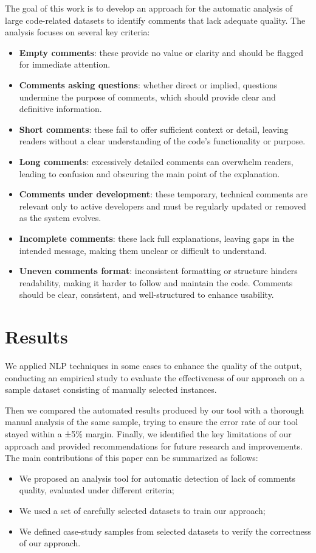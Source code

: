 \noindent The goal of this work is to develop an approach for the automatic analysis of large code-related datasets to identify comments that lack adequate quality. The analysis focuses on several key criteria:
\begin{itemize}
	\item \textbf{Empty comments}: these provide no value or clarity and should be flagged for immediate attention.
	\item \textbf{Comments asking questions}: whether direct or implied, questions undermine the purpose of comments, which should provide clear and definitive information.
	\item \textbf{Short comments}: these fail to offer sufficient context or detail, leaving readers without a clear understanding of the code’s functionality or purpose.
	\item \textbf{Long comments}: excessively detailed comments can overwhelm readers, leading to confusion and obscuring the main point of the explanation.
	\item \textbf{Comments under development}: these temporary, technical comments are relevant only to active developers and must be regularly updated or removed as the system evolves.
	\item \textbf{Incomplete comments}: these lack full explanations, leaving gaps in the intended message, making them unclear or difficult to understand.
	\item \textbf{Uneven comments format}: inconsistent formatting or structure hinders readability, making it harder to follow and maintain the code. Comments should be clear, consistent, and well-structured to enhance usability.
\end{itemize}

\section{Results}
We applied NLP techniques in some cases to enhance the quality of the output, conducting an empirical study to evaluate the effectiveness of our approach on a sample dataset consisting of manually selected instances.

\noindent Then we compared the automated results produced by our tool with a thorough manual analysis of the same sample, trying to ensure the error rate of our tool stayed within a ±5\% margin. Finally, we identified the key limitations of our approach and provided recommendations for future research and improvements. The main contributions of this paper can be summarized as follows:
\begin{itemize}
    \item We proposed an analysis tool for automatic detection of lack of comments quality, evaluated under different criteria;
    \item We used a set of carefully selected datasets to train our approach;
    \item We defined case-study samples from selected datasets to verify the correctness of our approach.
\end{itemize}

